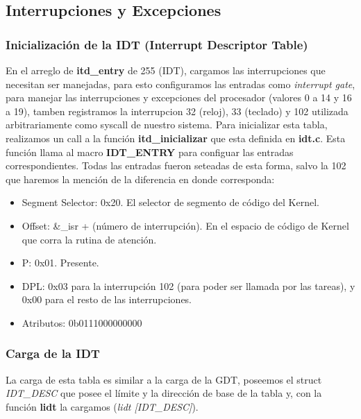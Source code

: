 \subsection{Interrupciones y Excepciones}

\subsubsection{Inicialización de la IDT (Interrupt Descriptor Table)}

En el arreglo de \textbf{itd_entry} de 255 (IDT), cargamos las interrupciones que necesitan ser manejadas, para esto configuramos las entradas como \textit{interrupt gate}, para manejar las interrupciones y excepciones del procesador (valores 0 a 14 y 16 a 19), tamben registramos la interrupcion 32 (reloj), 33 (teclado) y 102 utilizada arbitrariamente como syscall de nuestro sistema.
Para inicializar esta tabla, realizamos un call a la función \textbf{itd_inicializar} que esta definida en \textbf{idt.c}. Esta función llama al macro \textbf{IDT_ENTRY} para configuar las entradas correspondientes. 
Todas las entradas fueron seteadas de esta forma, salvo la 102 que haremos la mención de la diferencia en donde corresponda:

\begin{itemize}
	\item Segment Selector: 0x20. El selector de segmento de código del Kernel.
	\item Offset: \&_isr + (número de interrupción). En el espacio de código de Kernel que corra la rutina de atención.
	\item P: 0x01. Presente.
	\item DPL: 0x03 para la interrupción 102 (para poder ser llamada por las tareas), y 0x00 para el resto de las interrupciones.
	\item Atributos: 0b0111000000000
\end{itemize}



\subsubsection{Carga de la IDT}

La carga de esta tabla es similar a la carga de la GDT, poseemos el struct \textit{IDT_DESC} que posee el límite y la dirección de base de la tabla y, con la función \textbf{lidt} la cargamos (\textit{lidt [IDT_DESC]}).


